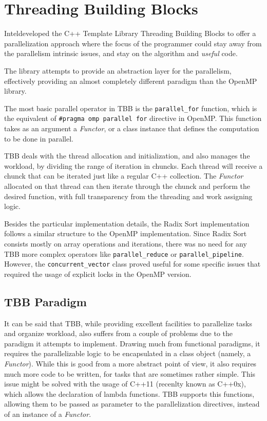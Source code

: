 \section{Threading Building Blocks}
\label{sec:500}

Intel\tr developed the C++ Template Library Threading Building Blocks to offer a parallelization approach where the focus of the programmer could stay away from the parallelism intrinsic issues, and stay on the algorithm and \textit{useful} code.

The library attempts to provide an abstraction layer for the parallelism, effectively providing an almost completely different paradigm than the OpenMP library.

The most basic parallel operator in TBB is the \texttt{parallel\_for} function, which is the equivalent of \texttt{\#pragma omp parallel for} directive in OpenMP. This function takes as an argument a \textit{Functor}, or a class instance that defines the computation to be done in parallel.

TBB deals with the thread allocation and initialization, and also manages the workload, by dividing the range of iteration in chuncks. Each thread will receive a chunck that can be iterated just like a regular C++ collection. The \textit{Functor} allocated on that thread can then iterate through the chunck and perform the desired function, with full transparency from the threading and work assigning logic.

Besides the particular implementation details, the Radix Sort implementation follows a similar structure to the OpenMP implementation. Since Radix Sort consists mostly on array operations and iterations, there was no need for any TBB more complex operators like \texttt{parallel\_reduce} or \texttt{parallel\_pipeline}. However, the \texttt{concurrent\_vector} class proved useful for some specific issues that required the usage of explicit locks in the OpenMP version.

\subsection{TBB Paradigm}
It can be said that TBB, while providing excellent facilities to parallelize tasks and organize workload, also suffers from a couple of problems due to the paradigm it attempts to implement. Drawing much from functional paradigms, it requires the parallelizable logic to be encapsulated in a class object (namely, a \textit{Functor}). While this is good from a more abstract point of view, it also requires much more code to be written, for tasks that are sometimes rather simple. This issue might be solved with the usage of C++11 (recenlty known as C++0x), which allows the declaration of lambda functions. TBB supports this functions, allowing them to be passed as parameter to the parallelization directives, instead of an instance of a \textit{Functor}.

